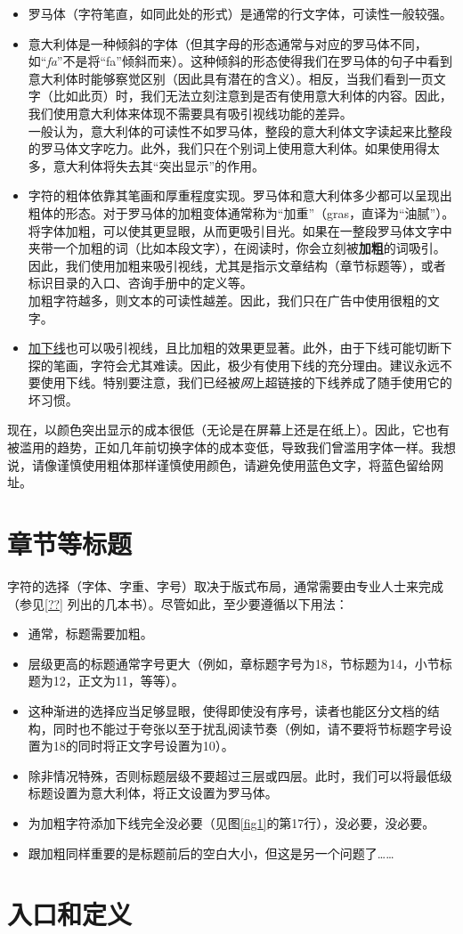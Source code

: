 \begin{itemize}
    \item 罗马体（字符笔直，如同此处的形式）是通常的行文字体，可读性一般较强。
    \item 意大利体是一种倾斜的字体（但其字母的形态通常与对应的罗马体不同，如“\emph{fa}”不是将“fa”倾斜而来）。这种倾斜的形态使得我们在罗马体的句子中看到意大利体时能够察觉区别（因此具有潜在的含义）。相反，当我们看到一页文字（比如此页）时，我们无法立刻注意到是否有使用意大利体的内容。因此，我们使用意大利体来体现不需要具有吸引视线功能的差异。\\
    一般认为，意大利体的可读性不如罗马体，整段的意大利体文字读起来比整段的罗马体文字吃力。此外，我们只在个别词上使用意大利体。如果使用得太多，意大利体将失去其“突出显示”的作用。
    \item 字符的粗体依靠其笔画和厚重程度实现。罗马体和意大利体多少都可以呈现出粗体的形态。对于罗马体的加粗变体通常称为“加重”（gras，直译为“油腻”）。将字体加粗，可以使其更显眼，从而更吸引目光。如果在一整段罗马体文字中夹带一个加粗的词（比如本段文字），在阅读时，你会立刻被\textbf{加粗}的词吸引。因此，我们使用加粗来吸引视线，尤其是指示文章结构（章节标题等），或者标识目录的入口、咨询手册中的定义等。\\
    加粗字符越多，则文本的可读性越差。因此，我们只在广告中使用很粗的文字。
    \item \underline{加下线}也可以吸引视线，且比加粗的效果更显著。此外，由于下线可能切断下探的笔画，字符会尤其难读。因此，极少有使用下线的充分理由。建议永远不要使用下线。特别要注意，我们已经被\emph{网}上超链接的下线养成了随手使用它的坏习惯。
\end{itemize}

现在，以颜色突出显示的成本很低（无论是在屏幕上还是在纸上）。因此，它也有被滥用的趋势，正如几年前切换字体的成本变低，导致我们曾滥用字体一样。我想说，请像谨慎使用粗体那样谨慎使用颜色，请避免使用蓝色文字，将蓝色留给网址。

\section{章节等标题}

字符的选择（字体、字重、字号）取决于版式布局，通常需要由专业人士来完成（参见\ref{??}%
列出的几本书）。尽管如此，至少要遵循以下用法：

\begin{itemize}
    \item 通常，标题需要加粗。
    \item 层级更高的标题通常字号更大（例如，章标题字号为18，节标题为14，小节标题为12，正文为11，等等）。
    \item 这种渐进的选择应当足够显眼，使得即使没有序号，读者也能区分文档的结构，同时也不能过于夸张以至于扰乱阅读节奏（例如，请不要将节标题字号设置为18的同时将正文字号设置为10）。
    \item 除非情况特殊，否则标题层级不要超过三层或四层。此时，我们可以将最低级标题设置为意大利体，将正文设置为罗马体。
    \item 为加粗字符添加下线完全没必要（见图\ref{fig1}的第17行），没必要，没必要。
    \item 跟加粗同样重要的是标题前后的空白大小，但这是另一个问题了……
\end{itemize}

\section{入口和定义}